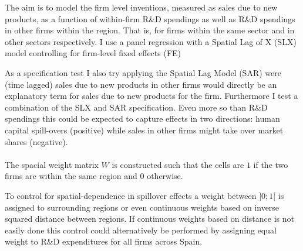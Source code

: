 \label{sec:empirics}
The aim is to model the firm level inventions, measured as sales due to new products, as a function of within-firm R\&D spendings as well as R\&D spendings in other firms within the region. That is, for firms within the same sector and in other sectors respectively. I use a panel regression with a Spatial Lag of X (SLX) model \citep{gibbons2012mostly} controlling for firm-level fixed effects (FE)

As a specification test I also try applying the Spatial Lag Model (SAR) were (time lagged) sales due to new products in other firms would directly be an explanatory term for sales due to new products for the firm. Furthermore I test a combination of the SLX and SAR specification. Even more so than R\&D spendings this could be expected to capture effects in two directions: human capital spill-overs (positive) while sales in other firms might take over market shares (negative).
\\
\\
The spacial weight matrix $W$ is constructed such that the cells are $1$ if the two firms are within the same region and $0$ otherwise.

To control for spatial-dependence in spillover effects a weight between $]0;1[$ is assigned to surrounding regions or even continuous weights based on inverse squared distance between regions. If continuous weights based on distance is not easily done this control could alternatively be performed by assigning equal weight to R\&D expenditures for all firms across Spain.
